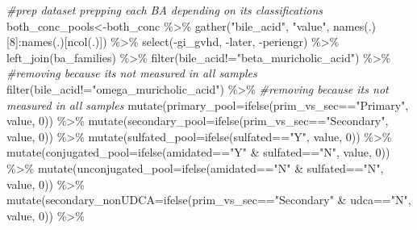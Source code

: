 \documentclass[
]{book}
\newenvironment{Shaded}{\begin{snugshade}}{\end{snugshade}}
\newcommand{\AttributeTok}[1]{\textcolor[rgb]{0.77,0.63,0.00}{#1}}
\newcommand{\CommentTok}[1]{\textcolor[rgb]{0.56,0.35,0.01}{\textit{#1}}}
\newcommand{\DecValTok}[1]{\textcolor[rgb]{0.00,0.00,0.81}{#1}}
\newcommand{\FunctionTok}[1]{\textcolor[rgb]{0.00,0.00,0.00}{#1}}
\newcommand{\NormalTok}[1]{#1}
\newcommand{\OtherTok}[1]{\textcolor[rgb]{0.56,0.35,0.01}{#1}}
\newcommand{\SpecialCharTok}[1]{\textcolor[rgb]{0.00,0.00,0.00}{#1}}
\newcommand{\StringTok}[1]{\textcolor[rgb]{0.31,0.60,0.02}{#1}}
\begin{document}
\begin{Shaded}
\begin{Highlighting}[]
\CommentTok{\#prep dataset prepping each BA depending on its classifications}
\NormalTok{both\_conc\_pools}\OtherTok{\textless{}{-}}\NormalTok{both\_conc }\SpecialCharTok{\%\textgreater{}\%} 
  \FunctionTok{gather}\NormalTok{(}\StringTok{"bile\_acid"}\NormalTok{, }\StringTok{"value"}\NormalTok{, }\FunctionTok{names}\NormalTok{(.)[}\DecValTok{8}\NormalTok{]}\SpecialCharTok{:}\FunctionTok{names}\NormalTok{(.)[}\FunctionTok{ncol}\NormalTok{(.)]) }\SpecialCharTok{\%\textgreater{}\%} 
  \FunctionTok{select}\NormalTok{(}\SpecialCharTok{{-}}\NormalTok{gi\_gvhd, }\SpecialCharTok{{-}}\NormalTok{later, }\SpecialCharTok{{-}}\NormalTok{periengr) }\SpecialCharTok{\%\textgreater{}\%} 
  \FunctionTok{left\_join}\NormalTok{(ba\_families) }\SpecialCharTok{\%\textgreater{}\%} 
  \FunctionTok{filter}\NormalTok{(bile\_acid}\SpecialCharTok{!=}\StringTok{"beta\_muricholic\_acid"}\NormalTok{) }\SpecialCharTok{\%\textgreater{}\%} \CommentTok{\#removing because it\textquotesingle{}s not measured in all samples}
  \FunctionTok{filter}\NormalTok{(bile\_acid}\SpecialCharTok{!=}\StringTok{"omega\_muricholic\_acid"}\NormalTok{) }\SpecialCharTok{\%\textgreater{}\%}  \CommentTok{\#removing because it\textquotesingle{}s not measured in all samples}
  \FunctionTok{mutate}\NormalTok{(}\AttributeTok{primary\_pool=}\FunctionTok{ifelse}\NormalTok{(prim\_vs\_sec}\SpecialCharTok{==}\StringTok{"Primary"}\NormalTok{, value, }\DecValTok{0}\NormalTok{)) }\SpecialCharTok{\%\textgreater{}\%} 
  \FunctionTok{mutate}\NormalTok{(}\AttributeTok{secondary\_pool=}\FunctionTok{ifelse}\NormalTok{(prim\_vs\_sec}\SpecialCharTok{==}\StringTok{"Secondary"}\NormalTok{, value, }\DecValTok{0}\NormalTok{)) }\SpecialCharTok{\%\textgreater{}\%} 
  \FunctionTok{mutate}\NormalTok{(}\AttributeTok{sulfated\_pool=}\FunctionTok{ifelse}\NormalTok{(sulfated}\SpecialCharTok{==}\StringTok{"Y"}\NormalTok{, value, }\DecValTok{0}\NormalTok{)) }\SpecialCharTok{\%\textgreater{}\%} 
  \FunctionTok{mutate}\NormalTok{(}\AttributeTok{conjugated\_pool=}\FunctionTok{ifelse}\NormalTok{(amidated}\SpecialCharTok{==}\StringTok{"Y"} \SpecialCharTok{\&}\NormalTok{ sulfated}\SpecialCharTok{==}\StringTok{"N"}\NormalTok{, value, }\DecValTok{0}\NormalTok{)) }\SpecialCharTok{\%\textgreater{}\%} 
  \FunctionTok{mutate}\NormalTok{(}\AttributeTok{unconjugated\_pool=}\FunctionTok{ifelse}\NormalTok{(amidated}\SpecialCharTok{==}\StringTok{"N"} \SpecialCharTok{\&}\NormalTok{ sulfated}\SpecialCharTok{==}\StringTok{"N"}\NormalTok{, value, }\DecValTok{0}\NormalTok{)) }\SpecialCharTok{\%\textgreater{}\%} 
  \FunctionTok{mutate}\NormalTok{(}\AttributeTok{secondary\_nonUDCA=}\FunctionTok{ifelse}\NormalTok{(prim\_vs\_sec}\SpecialCharTok{==}\StringTok{"Secondary"} \SpecialCharTok{\&}\NormalTok{ udca}\SpecialCharTok{==}\StringTok{"N"}\NormalTok{, value, }\DecValTok{0}\NormalTok{)) }\SpecialCharTok{\%\textgreater{}\%} 

\end{Highlighting}
\end{Shaded}
\end{document}
